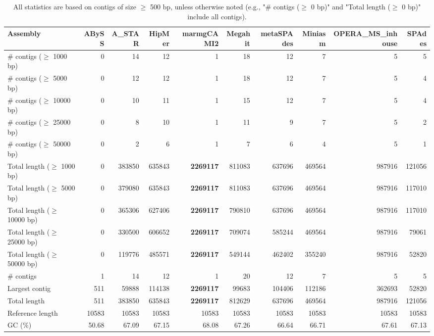 \documentclass[12pt,a4paper]{article}
\begin{document}
\begin{table}[ht]
\begin{center}
\caption{All statistics are based on contigs of size $\geq$ 500 bp, unless otherwise noted (e.g., "\# contigs ($\geq$ 0 bp)" and "Total length ($\geq$ 0 bp)" include all contigs).}
\begin{tabular}{|l*{9}{|r}|}
\hline
Assembly & ABySS & A\_STAR & HipMer & marmgCAMI2 & Megahit & metaSPAdes & Miniasm & OPERA\_MS\_inhouse & SPAdes \\ \hline
\# contigs ($\geq$ 1000 bp) & 0 & 14 & 12 & 1 & 18 & 12 & 7 & 5 & 5 \\ \hline
\# contigs ($\geq$ 5000 bp) & 0 & 12 & 12 & 1 & 18 & 12 & 7 & 5 & 4 \\ \hline
\# contigs ($\geq$ 10000 bp) & 0 & 10 & 11 & 1 & 15 & 12 & 7 & 5 & 4 \\ \hline
\# contigs ($\geq$ 25000 bp) & 0 & 8 & 10 & 1 & 11 & 9 & 7 & 5 & 2 \\ \hline
\# contigs ($\geq$ 50000 bp) & 0 & 2 & 6 & 1 & 7 & 6 & 4 & 5 & 1 \\ \hline
Total length ($\geq$ 1000 bp) & 0 & 383850 & 635843 & {\bf 2269117} & 811083 & 637696 & 469564 & 987916 & 121056 \\ \hline
Total length ($\geq$ 5000 bp) & 0 & 379080 & 635843 & {\bf 2269117} & 811083 & 637696 & 469564 & 987916 & 117010 \\ \hline
Total length ($\geq$ 10000 bp) & 0 & 365306 & 627406 & {\bf 2269117} & 790810 & 637696 & 469564 & 987916 & 117010 \\ \hline
Total length ($\geq$ 25000 bp) & 0 & 330500 & 606652 & {\bf 2269117} & 709074 & 585244 & 469564 & 987916 & 79061 \\ \hline
Total length ($\geq$ 50000 bp) & 0 & 119776 & 485571 & {\bf 2269117} & 549144 & 462402 & 355240 & 987916 & 52820 \\ \hline
\# contigs & 1 & 14 & 12 & 1 & 20 & 12 & 7 & 5 & 5 \\ \hline
Largest contig & 511 & 59888 & 114138 & {\bf 2269117} & 99683 & 104406 & 112186 & 362693 & 52820 \\ \hline
Total length & 511 & 383850 & 635843 & {\bf 2269117} & 812629 & 637696 & 469564 & 987916 & 121056 \\ \hline
Reference length & 10583 & 10583 & 10583 & 10583 & 10583 & 10583 & 10583 & 10583 & 10583 \\ \hline
GC (\%) & 50.68 & 67.09 & 67.15 & 68.08 & 67.26 & 66.64 & 66.71 & 67.61 & 67.13 \\ \hline

\end{tabular}
\end{center}
\end{table}
\end{document}
